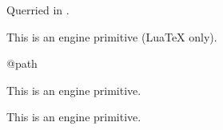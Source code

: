 \begin{function}[]
  {
    \inf
  }
  \begin{syntax}
  \end{syntax}

\end{function}



\begin{function}[int]
  {
    \init@series@setup
  }
  \begin{syntax}
  \end{syntax}
  
  Querried in . 
\end{function}



\begin{function}[]
  {
    \initcatcodetable
  }
  \begin{syntax}
  \end{syntax}
  This is an engine primitive (Lua\TeX{} only).
\end{function}



\begin{function}[]
  {
    @path
  }
  \begin{syntax}
  \end{syntax}

\end{function}



\begin{function}[]
  {
  }
  \begin{syntax}
  \end{syntax}

\end{function}



\begin{function}[]
  {
  }
  \begin{syntax}
  \end{syntax}
  This is an engine primitive.
\end{function}



\begin{function}[]
  {
    \insert
  }
  \begin{syntax}
  \end{syntax}
  This is an engine primitive.
\end{function}



